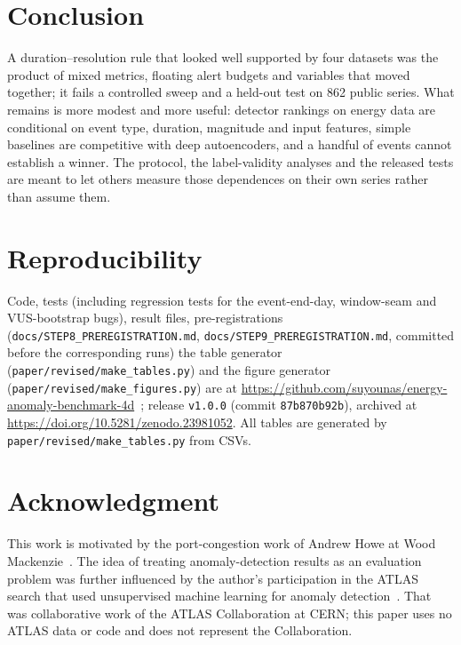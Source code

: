 \documentclass[10pt,twocolumn]{article}
\newif\ifanon \anonfalse
\begin{document}
\section{Conclusion}
A duration--resolution rule that looked well supported by four datasets was the product of mixed metrics, floating alert budgets and variables that moved together; it fails a controlled sweep and a held-out test on 862 public series. What remains is more modest and more useful: detector rankings on energy data are conditional on event type, duration, magnitude and input features, simple baselines are competitive with deep autoencoders, and a handful of events cannot establish a winner. The protocol, the label-validity analyses and the released tests are meant to let others measure those dependences on their own series rather than assume them.

\section*{Reproducibility}
Code, tests (including regression tests for the event-end-day, window-seam and VUS-bootstrap bugs), result files, pre-registrations (\texttt{docs/STEP8\_PREREGISTRATION.md}, \texttt{docs/STEP9\_PREREGISTRATION.md}, committed before the corresponding runs) the table generator (\texttt{paper/revised/make\_tables.py}) and the figure generator (\texttt{paper/revised/make\_figures.py}) are at \url{https://github.com/suyounas/energy-anomaly-benchmark-4d}~\cite{repo}; release \texttt{v1.0.0} (commit \texttt{87b870b92b}), archived at \url{https://doi.org/10.5281/zenodo.23981052}. All tables are generated by \texttt{paper/revised/make\_tables.py} from CSVs.

\ifanon\else
\section*{Acknowledgment}
This work is motivated by the port-congestion work of Andrew Howe at Wood Mackenzie~\cite{howe2022}.
The idea of treating anomaly-detection results as an evaluation problem was further influenced by the author's participation in the ATLAS search that used unsupervised machine learning for anomaly detection~\cite{atlas2024}. That was collaborative work of the ATLAS Collaboration at CERN; this paper uses no ATLAS data or code and does not represent the Collaboration.
\fi
\end{document}
